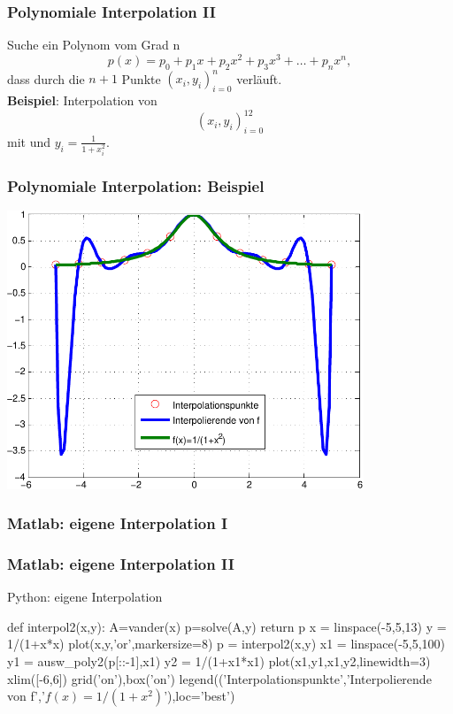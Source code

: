 \documentclass[hyperref={xetex}]{beamer}
\begin{document}
% 
% 
\begin{frame}[fragile]\frametitle{Polynomiale Interpolation II}
Suche ein Polynom vom Grad n
\[ p(x)= p_0 +p_1 x +p_2 x^2 +p_3 x^3+ \dots +p_n x^n,  \]
 dass durch die  $n+1$ Punkte $(x_i,y_i)_{i=0}^n$
verläuft.\\[1cm]

\textbf{Beispiel}: Interpolation von
\[ (x_i,y_i)_{i=0}^{12} \]
mit  und $y_i=\frac{1}{1+x_i^2}$. 
\end{frame}
% 
% 
\begin{frame}[fragile]\frametitle{Polynomiale Interpolation: Beispiel}
\begin{center}
\includegraphics[width=0.8\textwidth]{figures/grafik_7}
\end{center}
\end{frame}
% 
% 
\begin{frame}[fragile]\frametitle{Matlab: eigene Interpolation I}
\end{frame}

% 
% 
\begin{frame}[fragile]\frametitle{Matlab: eigene Interpolation II}
\end{frame}
\begin{frame}[fragile]{Python: eigene Interpolation}
\begin{pyin}
def interpol2(x,y):
    A=vander(x)
    p=solve(A,y)
    return p  
x = linspace(-5,5,13)
y = 1/(1+x*x)
plot(x,y,'or',markersize=8)
p = interpol2(x,y)
x1 = linspace(-5,5,100)
y1 = ausw_poly2(p[::-1],x1)
y2 = 1/(1+x1*x1)
plot(x1,y1,x1,y2,linewidth=3)
xlim([-6,6])
grid('on'),box('on')
legend(('Interpolationspunkte','Interpolierende von f','$f(x)=1/(1+x^2)$'),loc='best')  
\end{pyin}
  
\end{frame}
\end{document}
